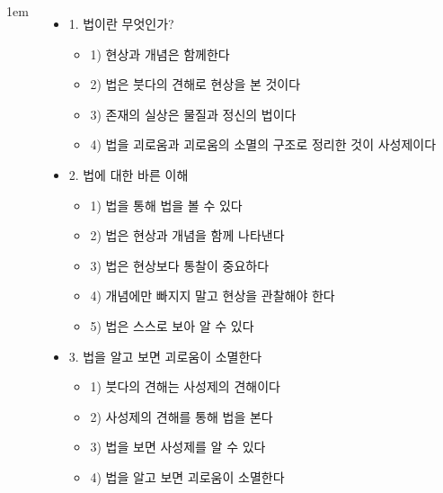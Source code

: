 \documentclass[	17pt, 
							a1paper, 
							portrait, %
							margin=0mm, %
							innermargin=10mm,  		%
							colspace=5mm, 
							subcolspace=0mm
							]{tikzposter}
\begin{document}
\begin{columns}
{\begin{itemize}
					\end{itemize}
			}


			{
					\setlength{\leftmargini}{2em}
					\setlength{\labelsep} {1em}
					\begin{itemize}
					\item 1. 법이란 무엇인가?
						\begin{itemize}
						\item 1) 현상과 개념은 함께한다
						\item 2) 법은 붓다의 견해로 현상을 본 것이다
						\item 3) 존재의 실상은 물질과 정신의 법이다
						\item 4) 법을 괴로움과 괴로움의 소멸의 구조로 정리한 것이 사성제이다
						\end{itemize}

					\item 2. 법에 대한 바른 이해
						\begin{itemize}
						\item 1) 법을 통해 법을 볼 수 있다
						\item 2) 법은 현상과 개념을 함께 나타낸다
						\item 3) 법은 현상보다 통찰이 중요하다
						\item 4) 개념에만 빠지지 말고 현상을 관찰해야 한다
						\item 5) 법은 스스로 보아 알 수 있다
						\end{itemize}
	
					\item 3. 법을 알고 보면 괴로움이 소멸한다
						\begin{itemize}
						\item 1) 붓다의 견해는 사성제의 견해이다
						\item 2) 사성제의 견해를 통해 법을 본다
						\item 3) 법을 보면 사성제를 알 수 있다
						\item 4) 법을 알고 보면 괴로움이 소멸한다
						\end{itemize}
					\end{itemize}

			}




\end{columns}
\end{document}
